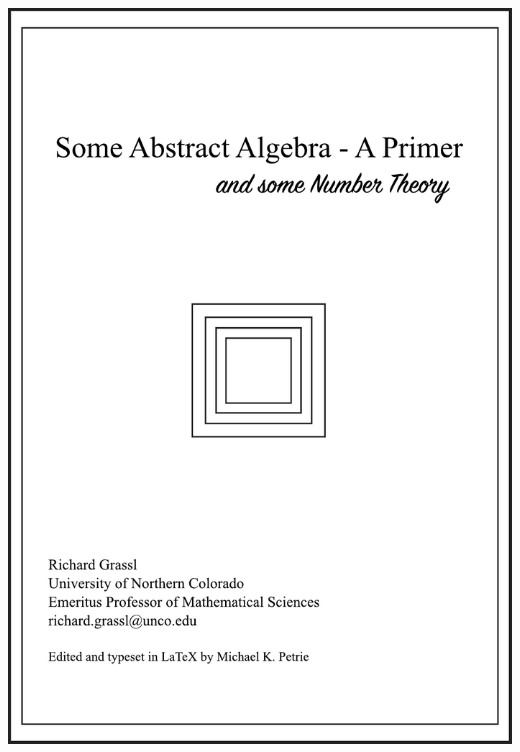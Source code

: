 \documentclass[12pt, fleqn, oneside]{book}
\begin{document}
\setcounter{page}{51}

\setlength{\parindent}{0in}

\pagestyle{empty}

\centerline{\includegraphics[width=6in]{Coverpage.pdf}}
~
\clearpage

\thispagestyle{plain}
\tableofcontents

\cleardoublepage

\pagestyle{fancy}
\end{document}
